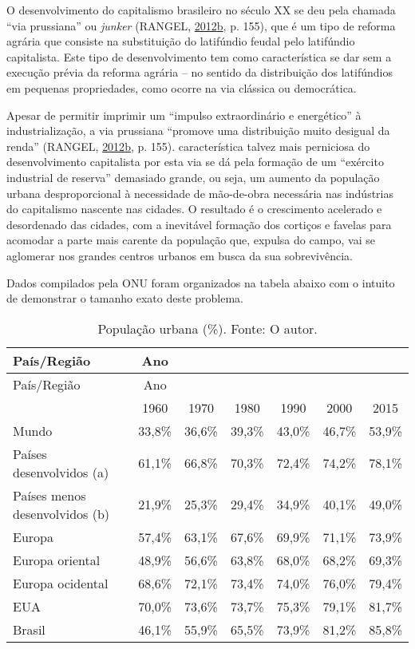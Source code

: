 \documentclass[a4paper, 12pt]{article}
\begin{document}
O desenvolvimento do capitalismo brasileiro no século XX se deu pela
chamada ``via prussiana'' ou \emph{junker} (RANGEL,
\protect\hyperlink{ref-rangel1988}{2012}\protect\hyperlink{ref-rangel1988}{b},
p. 155), que é um tipo de reforma agrária que consiste na substituição
do latifúndio feudal pelo latifúndio capitalista. Este tipo de
desenvolvimento tem como característica se dar sem a execução prévia da
reforma agrária -- no sentido da distribuição dos latifúndios em
pequenas propriedades, como ocorre na via clássica ou democrática.

Apesar de permitir imprimir um ``impulso extraordinário e energético'' à
industrialização, a via prussiana ``promove uma distribuição muito
desigual da renda'' (RANGEL,
\protect\hyperlink{ref-rangel1988}{2012}\protect\hyperlink{ref-rangel1988}{b},
p. 155). característica talvez mais perniciosa do desenvolvimento
capitalista por esta via se dá pela formação de um ``exército industrial
de reserva'' demasiado grande, ou seja, um aumento da população urbana
desproporcional à necessidade de mão-de-obra necessária nas indústrias
do capitalismo nascente nas cidades. O resultado é o crescimento
acelerado e desordenado das cidades, com a inevitável formação dos
cortiços e favelas para acomodar a parte mais carente da população que,
expulsa do campo, vai se aglomerar nos grandes centros urbanos em busca
da sua sobrevivência.

Dados compilados pela ONU foram organizados na tabela abaixo com o
intuito de demonstrar o tamanho exato deste problema.

\begin{longtable}[]{@{}lcccccc@{}}
\caption{População urbana (\%). Fonte: O autor.}\tabularnewline
\toprule
País/Região & Ano & & & & &\tabularnewline
\midrule
\endfirsthead
\toprule
País/Região & Ano & & & & &\tabularnewline
\midrule
\endhead
& 1960 & 1970 & 1980 & 1990 & 2000 & 2015\tabularnewline
Mundo & 33,8\% & 36,6\% & 39,3\% & 43,0\% & 46,7\% &
53,9\%\tabularnewline
Países desenvolvidos (a) & 61,1\% & 66,8\% & 70,3\% & 72,4\% & 74,2\% &
78,1\%\tabularnewline
Países menos desenvolvidos (b) & 21,9\% & 25,3\% & 29,4\% & 34,9\% &
40,1\% & 49,0\%\tabularnewline
Europa & 57,4\% & 63,1\% & 67,6\% & 69,9\% & 71,1\% &
73,9\%\tabularnewline
Europa oriental & 48,9\% & 56,6\% & 63,8\% & 68,0\% & 68,2\% &
69,3\%\tabularnewline
Europa ocidental & 68,6\% & 72,1\% & 73,4\% & 74,0\% & 76,0\% &
79,4\%\tabularnewline
EUA & 70,0\% & 73,6\% & 73,7\% & 75,3\% & 79,1\% & 81,7\%\tabularnewline
Brasil & 46,1\% & 55,9\% & 65,5\% & 73,9\% & 81,2\% &
85,8\%\tabularnewline
\bottomrule
\end{longtable}
\end{document}
